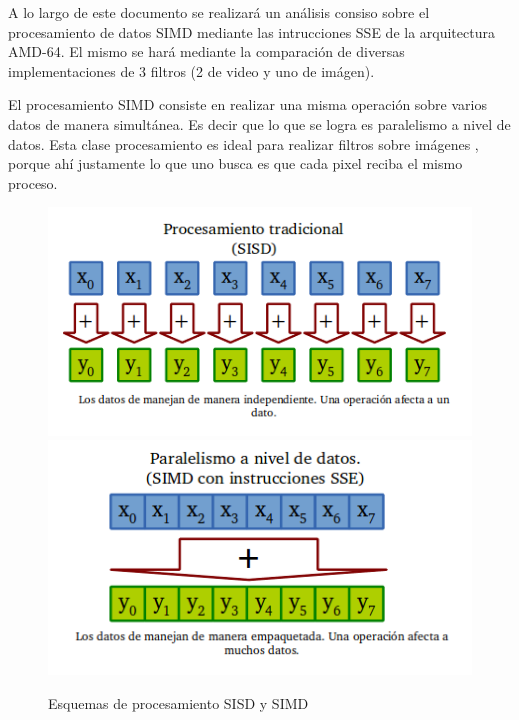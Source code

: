 

	A lo largo de este documento se realizará un análisis consiso sobre el
procesamiento de datos SIMD mediante las intrucciones SSE de la arquitectura
AMD-64. El mismo se hará mediante la comparación de diversas implementaciones
de 3 filtros (2 de video y uno de imágen).

	El procesamiento SIMD consiste en realizar una misma operación sobre varios
datos de manera simultánea. Es decir que lo que se logra es paralelismo a nivel
de datos. Esta clase procesamiento es ideal para realizar filtros sobre imágenes
, porque ahí justamente lo que uno busca es que cada pixel reciba el mismo proceso.


\begin{figure}[h]
\begin{center}
  \includegraphics[scale=0.4]{secciones/introduccion/imagenes/SISD.png}
    \includegraphics[scale=0.4]{secciones/introduccion/imagenes/SIMD.png}
\end{center}
\caption{Esquemas de procesamiento SISD y SIMD}
\label{fig:SISD-SIMD}
\end{figure}


